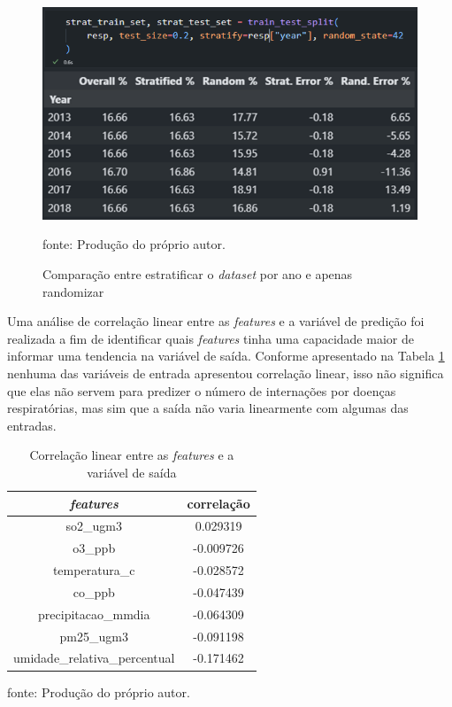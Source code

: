 \documentclass[
  12pt,		%
  a4paper,	%
  openright,%
  oneside,	%
  chapter=TITLE,		%
  section=TITLE,		%
  english,	%
  french,	%
  spanish,	%
  brazil	%
]{abntex2}
\begin{document}
    \begin{figure}[ht]
        \centering
        \caption{Comparação entre estratificar o \textit{dataset} por ano e apenas randomizar}
        \includegraphics[width=12cm]{../reports/figures/estratificar.png}
        \label{estratificado}
        \par
        {\small fonte: Produção do próprio autor.}
    \end{figure}

    Uma análise de correlação linear entre as \textit{features} e a variável de predição foi realizada a fim de identificar
    quais \textit{features} tinha uma capacidade maior de informar uma tendencia na variável de saída. Conforme apresentado na Tabela
    \ref*{corr_table} nenhuma das variáveis de entrada apresentou correlação linear, isso não significa que elas não servem para 
    predizer o número de internações por doenças respiratórias, mas sim que a saída não varia linearmente com algumas
    das entradas.

    \begin{table}[ht]
        \centering
        \caption{Correlação linear entre as \textit{features} e a variável de saída}
        \label{corr_table}
        \begin{tabular}{cc}
            \hline
            \multicolumn{1}{|c|}{\textit{features}} & \multicolumn{1}{c|}{correlação}\\
            \hline
            so2\_ugm3 & 0.029319\\
            o3\_ppb & -0.009726\\
            temperatura\_c & -0.028572\\
            co\_ppb & -0.047439\\
            precipitacao\_mmdia & -0.064309\\
            pm25\_ugm3 & -0.091198\\
            umidade\_relativa\_percentual & -0.171462\\
            \hline
        \end{tabular}
        \par
        {\small fonte: Produção do próprio autor.}
    \end{table}
\end{document}
